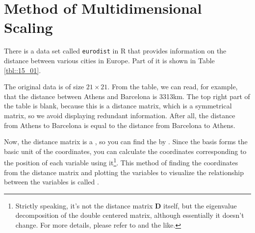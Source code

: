 \documentclass{ltjsbook}
\begin{document}
\section{Method of Multidimensional Scaling}
There is a data set called \texttt{eurodist} in R that provides information on the distance between various cities in Europe. Part of it is shown in Table \ref{tbl::15_01}.



The original data is of size $21 \times 21$. From the table, we can read, for example, that the distance between Athens and Barcelona is 3313km. The top right part of the table is blank, because this is a distance matrix, which is a symmetrical matrix, so we avoid displaying redundant information. After all, the distance from Athens to Barcelona is equal to the distance from Barcelona to Athens.

Now, the distance matrix is a , so you can find the  by . Since the basis forms the basic unit of the coordinates, you can calculate the coordinates corresponding to the position of each variable using it\footnote{Strictly speaking, it's not the distance matrix $\bm{D}$ itself, but the eigenvalue decomposition of the double centered matrix, although essentially it doesn't change. For more details, please refer to \textcite{Okada19940115} and the like.}. This method of finding the coordinates from the distance matrix and plotting the variables to visualize the relationship between the variables is called .
\end{document}
